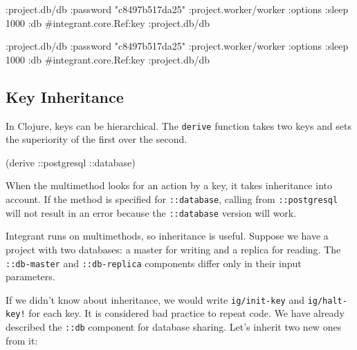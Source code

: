 \ifnarrow

\begin{english}
  \begin{clojure}
{:project.db/db
 {:password "c8497b517da25"}
 :project.worker/worker
 {:options {:sleep 1000}
  :db
  #integrant.core.Ref{:key
                      :project.db/db}}}
  \end{clojure}
\end{english}

\else

\begin{english}
  \begin{clojure}
{:project.db/db {:password "c8497b517da25"}
 :project.worker/worker
 {:options {:sleep 1000}
  :db #integrant.core.Ref{:key :project.db/db}}}
  \end{clojure}
\end{english}

\fi

\subsection{Key Inheritance}


In Clojure, keys can be hierarchical. The \verb|derive| function takes two keys and sets the superiority of the first over the second.


\begin{english}
  \begin{clojure}
(derive ::postgresql ::database)
  \end{clojure}
\end{english}


When the multimethod looks for an action by a key, it takes inheritance into account. If the method is specified for \verb|::database|, calling from \verb|::postgresql| will not result in an error because the \verb|::database| version will work.

Integrant runs on multimethods, so inheritance is useful. Suppose we have a project with two databases: a master for writing and a replica for reading. The \verb|::db-master| and \verb|::db-replica| components differ only in their input parameters.

If we didn't know about inheritance, we would write \verb|ig/init-key| and \verb|ig/halt-key!| for each key. It is considered bad practice to repeat code. We have already described the \verb|::db| component for database sharing. Let's inherit two new ones from it:

